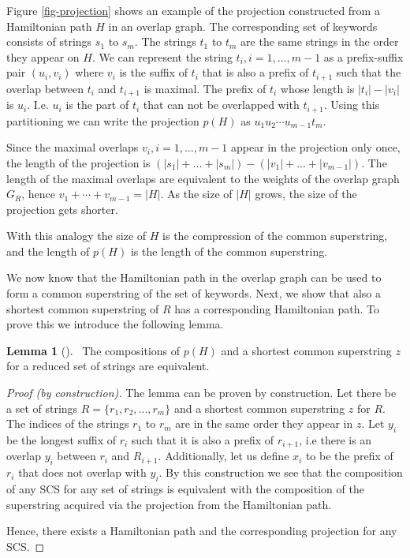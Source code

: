 \documentclass[english,twoside,censored,csm,algorithms-track-2020]{HYthesisML}
\theoremstyle{plain}
\theoremstyle{definition}
\newtheorem{lemma}[theorem]{Lemma}
\begin{document}

Figure \ref{fig-projection} shows an example of the projection constructed from a
Hamiltonian path $H$ in an overlap graph. The corresponding set of keywords consists of
strings $s_1$ to $s_m$. The strings $t_1$ to $t_m$ are the same strings in the order they appear on $H$.
We can represent the string $t_i, i=1,...,m-1$ as a prefix-suffix pair
$(u_i,v_i)$ where $v_i$ is the suffix of $t_i$ that is also a prefix of $t_{i+1}$ such that the
overlap between $t_i$ and $t_{i+1}$ is maximal. The prefix of $t_i$ whose length is $|t_i|-|v_i|$ is
$u_i$. I.e. $u_i$ is the part of $t_i$ that can not be overlapped with $t_{i+1}$. Using this
partitioning we can write the projection $p(H)$ as $u_1u_2\cdots u_{m-1}t_m$.

Since the maximal overlaps $v_i,i=1,...,m-1$ appear in the projection only once, the length of the
projection is $(|s_1|+...+|s_m|) - (|v_1|+...+|v_{m-1}|)$. The length of the maximal overlaps
are equivalent to the weights of the overlap graph $G_R$, hence $v_1+\cdots +v_{m-1} = |H|$. As the size
of $|H|$ grows, the size of the projection gets shorter.


With this analogy the size of $H$ is the compression of the common superstring,
and the length of $p(H)$ is the length of the common superstring.

We now know that the Hamiltonian path in the overlap graph can be used to form a common superstring
of the set of keywords. Next, we show that also a shortest common superstring of $R$ has a
corresponding Hamiltonian path. To prove this we introduce the following lemma.


\begin{lemma}[]~\label{lem-composition}
The compositions of $p(H)$ and a shortest common superstring $z$ for a reduced set of strings are equivalent.
\end{lemma}
\begin{proof}[Proof (by construction)]
  The lemma can be proven by construction. Let there be a set of strings $R=\{r_1,r_2,...,r_m\}$ and
  a shortest common superstring $z$ for $R$. The indices of the strings $r_1$ to $r_m$ are in the same
  order they appear in $z$. Let $y_i$ be the longest suffix of $r_i$ such that it is also a prefix
  of $r_{i+1}$, i.e there is an overlap $y_i$ between $r_i$ and $R_{i+1}$. Additionally, let us
  define $x_i$ to be the prefix of $r_i$ that does not overlap with $y_i$. By this construction we
  see that the composition of any SCS for any set of strings is equivalent with the composition
  of the superstring acquired via the projection from the Hamiltonian path.

  Hence, there exists a
  Hamiltonian path and the corresponding projection for any SCS.
\end{proof}
\end{document}
